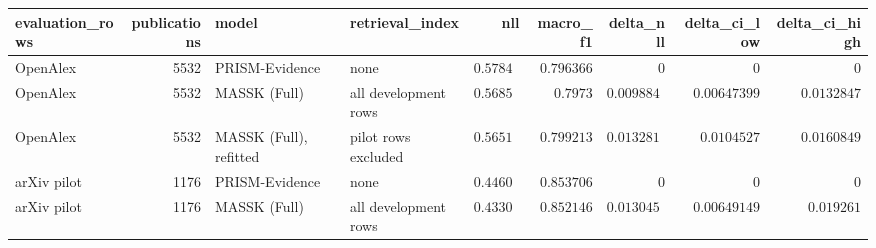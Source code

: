 \begin{tabular}{lrllrrrrr}
\toprule
evaluation\_rows & publications & model & retrieval\_index & nll & macro\_f1 & delta\_nll & delta\_ci\_low & delta\_ci\_high \\
\midrule
OpenAlex & 5532 & PRISM-Evidence & none & $0.578445$ & $0.796366$ & $0$ & $0$ & $0$ \\
OpenAlex & 5532 & MASSK (Full) & all development rows & $0.568561$ & $0.7973$ & $0.00988426$ & $0.00647399$ & $0.0132847$ \\
OpenAlex & 5532 & MASSK (Full), refitted & pilot rows excluded & $0.565164$ & $0.799213$ & $0.0132814$ & $0.0104527$ & $0.0160849$ \\
arXiv pilot & 1176 & PRISM-Evidence & none & $0.446093$ & $0.853706$ & $0$ & $0$ & $0$ \\
arXiv pilot & 1176 & MASSK (Full) & all development rows & $0.433047$ & $0.852146$ & $0.0130454$ & $0.00649149$ & $0.019261$ \\
\bottomrule
\end{tabular}

